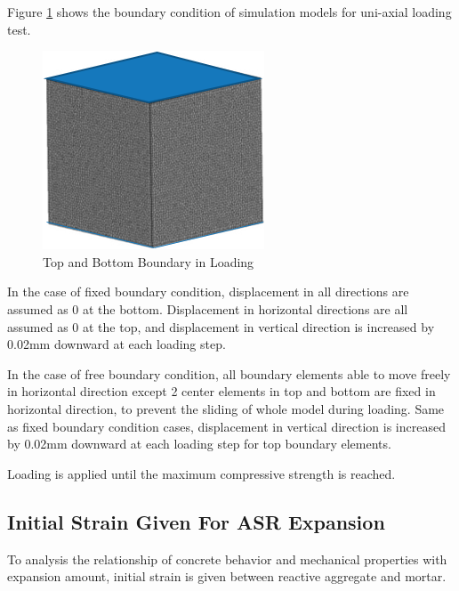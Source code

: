 Figure \ref{boundary} shows the boundary condition of simulation models for uni-axial loading test.

\begin{figure}[h!]
  \centering
  \includegraphics{Files/Background/LOAD.png}
  \caption{Top and Bottom Boundary in Loading}
  \label{boundary}
\end{figure}

In the case of fixed boundary condition, displacement in all directions are assumed as 0 at the bottom. Displacement in horizontal directions are all assumed as 0 at the top, and displacement in vertical direction is increased by 0.02mm downward at each loading step.

In the case of free boundary condition, all boundary elements able to move freely in horizontal direction except 2 center elements in top and bottom are fixed in horizontal direction, to prevent the sliding of whole model during loading. Same as fixed boundary condition cases, displacement in vertical direction is increased by 0.02mm downward at each loading step for top boundary elements.

Loading is applied until the maximum compressive strength is reached.

\subsection{Initial Strain Given For ASR Expansion}

To analysis the relationship of concrete behavior and mechanical properties with expansion amount, initial strain is given between reactive aggregate and mortar.

